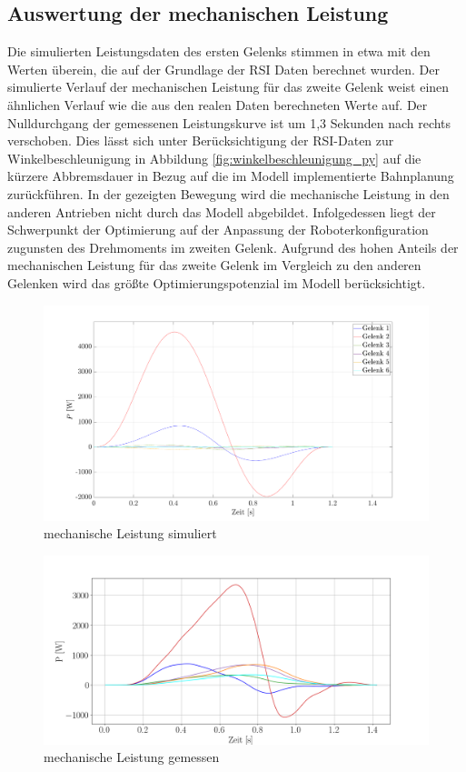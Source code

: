 \subsection*{Auswertung der mechanischen Leistung}
Die simulierten Leistungsdaten des ersten Gelenks stimmen in etwa mit den Werten überein, die auf der Grundlage der RSI Daten berechnet wurden. Der simulierte Verlauf der mechanischen Leistung für das zweite Gelenk weist einen ähnlichen Verlauf wie die aus den realen Daten berechneten Werte auf. Der Nulldurchgang der gemessenen Leistungskurve ist um 1,3 Sekunden nach rechts verschoben.  Dies lässt sich unter Berücksichtigung der RSI-Daten zur Winkelbeschleunigung in Abbildung \ref{fig:winkelbeschleunigung_py} auf die kürzere Abbremsdauer in Bezug auf die im Modell implementierte Bahnplanung  zurückführen. In der gezeigten Bewegung wird die mechanische Leistung in den anderen Antrieben nicht durch das Modell abgebildet. Infolgedessen liegt der Schwerpunkt der Optimierung auf der Anpassung der Roboterkonfiguration zugunsten des Drehmoments im zweiten Gelenk. Aufgrund des hohen Anteils der mechanischen Leistung für das zweite Gelenk im Vergleich zu den anderen Gelenken wird das größte Optimierungspotenzial im Modell berücksichtigt. 
%
\begin{figure}[tbph]
	\centering
	\includegraphics[width=1\linewidth]{images/pmat}
	\caption{mechanische Leistung simuliert}
	\label{fig:pmat}
\end{figure}
%
\begin{figure}[tbph]
	\centering
	\includegraphics[width=1\linewidth]{images/p}
	\caption{mechanische Leistung gemessen}
	\label{fig:p}
\end{figure}
%
